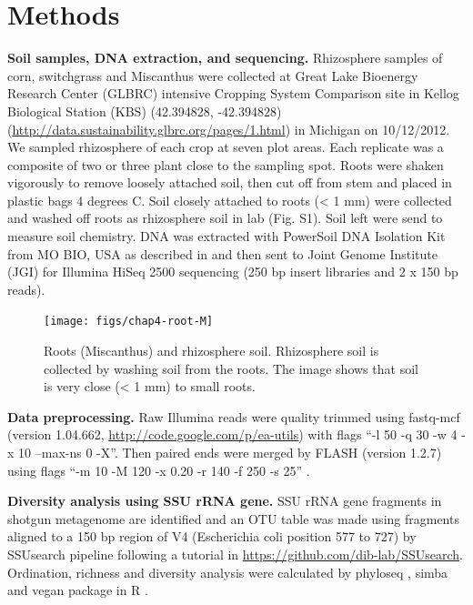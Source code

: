 \documentclass[]{msu-thesis}
\begin{document}
\section{Methods}

\textbf{Soil samples, DNA extraction, and sequencing.} Rhizosphere samples of corn, switchgrass and Miscanthus were collected at Great Lake Bioenergy Research Center (GLBRC) intensive Cropping System Comparison site in Kellog Biological Station (KBS) (42.394828, -42.394828) (\url{http://data.sustainability.glbrc.org/pages/1.html}) in Michigan on 10/12/2012. We sampled rhizosphere of each crop at seven plot areas. Each replicate was a composite of two or three plant close to the sampling spot. Roots were shaken vigorously to remove loosely attached soil, then cut off from stem and placed in plastic bags 4 degrees C. Soil closely attached to roots (< 1 mm) were collected and washed off roots as rhizosphere soil in lab (Fig. S1). Soil left were send to measure soil chemistry. DNA was extracted with PowerSoil DNA Isolation Kit from MO BIO, USA as described in \cite{jesus_influence_2015} and then sent to Joint Genome Institute (JGI) for Illumina HiSeq 2500 sequencing (250 bp insert libraries and 2 x 150 bp reads).

\begin{figure}[tbph!]
  \centering
  \texttt{[image: figs/chap4-root-M]}
  \caption[Roots (Miscanthus) and rhizosphere soil]{Roots (Miscanthus) and rhizosphere soil. Rhizosphere soil is collected by washing soil from the roots. The image shows that soil is very close (< 1 mm) to small roots.}
  \label{fig:chap4FigS1}
\end{figure}


\textbf{Data preprocessing. }
Raw Illumina reads were quality trimmed using fastq-mcf (version 1.04.662, \url{http://code.google.com/p/ea-utils}) with flags ``-l 50 -q 30 -w 4 -x 10 –max-ns 0 -X''. Then paired ends were merged by FLASH (version 1.2.7) \cite{magoc_flash:_2011} using flags ``-m 10 -M 120 -x 0.20 -r 140 -f 250 -s 25'' \cite{guo_microbial_2015}.

\textbf{Diversity analysis using SSU rRNA gene. }
SSU rRNA gene fragments in shotgun metagenome are identified and an OTU table was made using fragments aligned to a 150 bp region of V4 (Escherichia coli position 577 to 727) by SSUsearch pipeline \cite{guo_microbial_2015} following a tutorial in \url{https://github.com/dib-lab/SSUsearch}. Ordination, richness and diversity analysis were calculated by phyloseq \cite{mcmurdie_phyloseq:_2013}, simba \cite{jurasinski_simba:_2012} and vegan \cite{oksanen_vegan:_2015} package in R \cite{r_core_team_r:_2014}.
\end{document}

